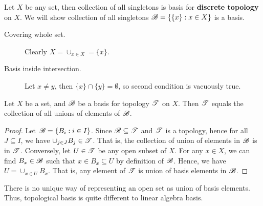 \documentclass[a4paper,english,12pt]{article}   	%
\begin{document}
\begin{exmp}
 Let $X$ be any set, then collection of all singletons is basis for \textbf{discrete topology} on $X$.
We will show collection of all singletons $\mathscr{B} = \{ \{x\}: x \in X\}$ is a basis.
	\begin{description}
		\item[Covering whole set.] Clearly $X = \cup_{x \in X} = \{x\}$.
		\item[Basis inside intersection.] Let $x \neq y$, then $\{x\} \cap \{y\} = \emptyset$, so second condition is vacuously true.
	\end{description}
\end{exmp}
\begin{lem}
Let $X$ be a set, and $\mathscr{B}$ be a basis for topology $\mathscr{T}$ on $X$. Then $\mathscr{T}$ equals the collection of all unions of elements of $\mathscr{B}$.
\end{lem}
\begin{proof} Let $\mathscr{B} = \{B_i: i \in I\}$. Since $\mathscr{B} \subseteq \mathscr{T}$ and $\mathscr{T}$ is a topology, hence for all $J \subseteq I$, we have $\cup_{j \in J}B_j \in \mathscr{T}$. That is, the collection of union of elements in $\mathscr{B}$ is in $\mathscr{T}$. 
Conversely, let $U \in \mathscr{T}$ be any open subset of $X$. For any $x \in X$, we can find $B_x \in \mathscr{B}$ such that $x \in B_x \subseteq U$ by definition of $\mathscr{B}$. Hence, we have $U = \cup_{x \in U}B_x$. That is, any element of $\mathscr{T}$ is union of basis elements in $\mathscr{B}$.
\end{proof}

\begin{rem} There is no unique way of representing an open set as union of basis elements. Thus, topological basis is quite different to linear algebra basis. 
\end{rem}
\end{document}
